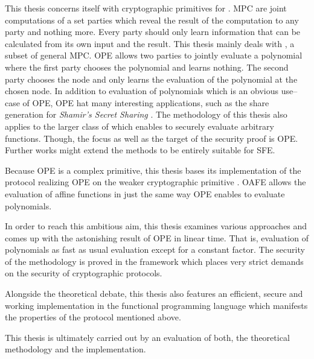 This thesis concerns itself with cryptographic primitives for . MPC are joint computations of a set parties
which reveal the result of the computation to any party and nothing more. Every
party should only learn information that can be calculated from its own input
and the result. This thesis mainly deals with , a subset of general MPC. OPE allows two parties to jointly
evaluate a polynomial where the first party chooses the polynomial and learns
nothing. The second party chooses the node and only learns the evaluation of the
polynomial at the chosen node. In addition to evaluation of polynomials which
is an obvious use--case of OPE, OPE hat many interesting applications, such as
the share generation for \emph{Shamir's Secret Sharing} \cite{shamir79}. The
methodology of this thesis also applies to the larger class of  which enables to securely evaluate arbitrary
functions. Though, the focus as well as the target of the security proof is OPE.
Further works might extend the methods to be entirely suitable for SFE.

Because OPE is a complex primitive, this thesis bases its implementation of the
protocol realizing OPE on the weaker cryptographic primitive . OAFE allows the evaluation of affine
functions in just the same way OPE enables to evaluate polynomials.

In order to reach this ambitious aim, this thesis examines various approaches
and comes up with the astonishing result of OPE in linear time. That is,
evaluation of polynomials as fast as usual evaluation except for a constant
factor. The security of the methodology is proved in the  framework \cite{canetti05} which places very strict demands
on the security of cryptographic protocols.

Alongside the theoretical debate, this thesis also features an efficient, secure
and working implementation in the functional programming language \JWThaskell{}
which manifests the properties of the protocol mentioned above.

This thesis is ultimately carried out by an evaluation of both, the theoretical
methodology and the implementation.

\cleardoublepage

